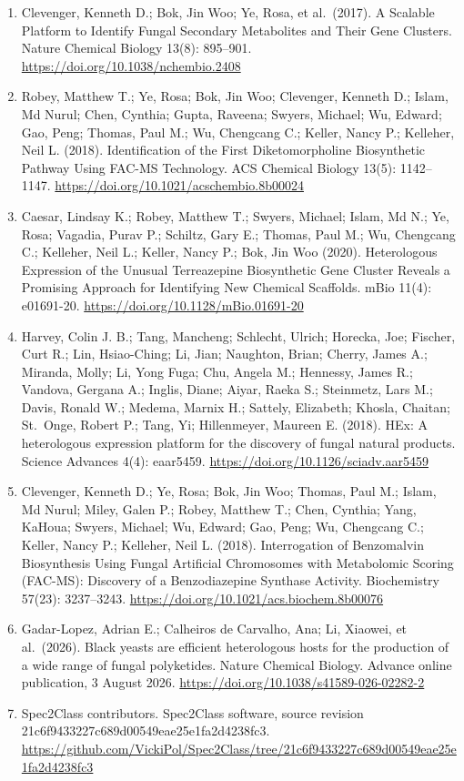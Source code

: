 \documentclass[
  10pt,
  a4paper,
]{article}
\begin{document}
\begin{enumerate}
\item
  Clevenger, Kenneth D.; Bok, Jin Woo; Ye, Rosa, et al.~(2017). A Scalable Platform to Identify Fungal Secondary Metabolites and Their Gene Clusters. Nature Chemical Biology 13(8): 895--901. \url{https://doi.org/10.1038/nchembio.2408}
\item
  Robey, Matthew T.; Ye, Rosa; Bok, Jin Woo; Clevenger, Kenneth D.; Islam, Md Nurul; Chen, Cynthia; Gupta, Raveena; Swyers, Michael; Wu, Edward; Gao, Peng; Thomas, Paul M.; Wu, Chengcang C.; Keller, Nancy P.; Kelleher, Neil L. (2018). Identification of the First Diketomorpholine Biosynthetic Pathway Using FAC-MS Technology. ACS Chemical Biology 13(5): 1142--1147. \url{https://doi.org/10.1021/acschembio.8b00024}
\item
  Caesar, Lindsay K.; Robey, Matthew T.; Swyers, Michael; Islam, Md N.; Ye, Rosa; Vagadia, Purav P.; Schiltz, Gary E.; Thomas, Paul M.; Wu, Chengcang C.; Kelleher, Neil L.; Keller, Nancy P.; Bok, Jin Woo (2020). Heterologous Expression of the Unusual Terreazepine Biosynthetic Gene Cluster Reveals a Promising Approach for Identifying New Chemical Scaffolds. mBio 11(4): e01691-20. \url{https://doi.org/10.1128/mBio.01691-20}
\item
  Harvey, Colin J. B.; Tang, Mancheng; Schlecht, Ulrich; Horecka, Joe; Fischer, Curt R.; Lin, Hsiao-Ching; Li, Jian; Naughton, Brian; Cherry, James A.; Miranda, Molly; Li, Yong Fuga; Chu, Angela M.; Hennessy, James R.; Vandova, Gergana A.; Inglis, Diane; Aiyar, Raeka S.; Steinmetz, Lars M.; Davis, Ronald W.; Medema, Marnix H.; Sattely, Elizabeth; Khosla, Chaitan; St.~Onge, Robert P.; Tang, Yi; Hillenmeyer, Maureen E. (2018). HEx: A heterologous expression platform for the discovery of fungal natural products. Science Advances 4(4): eaar5459. \url{https://doi.org/10.1126/sciadv.aar5459}
\item
  Clevenger, Kenneth D.; Ye, Rosa; Bok, Jin Woo; Thomas, Paul M.; Islam, Md Nurul; Miley, Galen P.; Robey, Matthew T.; Chen, Cynthia; Yang, KaHoua; Swyers, Michael; Wu, Edward; Gao, Peng; Wu, Chengcang C.; Keller, Nancy P.; Kelleher, Neil L. (2018). Interrogation of Benzomalvin Biosynthesis Using Fungal Artificial Chromosomes with Metabolomic Scoring (FAC-MS): Discovery of a Benzodiazepine Synthase Activity. Biochemistry 57(23): 3237--3243. \url{https://doi.org/10.1021/acs.biochem.8b00076}
\item
  Gadar-Lopez, Adrian E.; Calheiros de Carvalho, Ana; Li, Xiaowei, et al.~(2026). Black yeasts are efficient heterologous hosts for the production of a wide range of fungal polyketides. Nature Chemical Biology. Advance online publication, 3 August 2026. \url{https://doi.org/10.1038/s41589-026-02282-2}
\item
  Spec2Class contributors. Spec2Class software, source revision 21c6f9433227c689d00549eae25e1fa2d4238fc3. \url{https://github.com/VickiPol/Spec2Class/tree/21c6f9433227c689d00549eae25e1fa2d4238fc3}
\end{enumerate}
\end{document}
